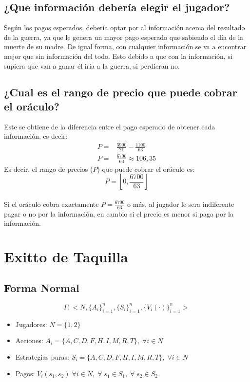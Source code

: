 \documentclass[12pt]{article}
\begin{document}
\subsection{¿Que información debería elegir el jugador?}
Según los pagos esperados, debería optar por al información acerca del resultado de la guerra, ya que le genera un mayor pago esperado que sabiendo el día de la muerte de su madre. De igual forma, con cualquier información se va a encontrar mejor que sin información del todo. Esto debido a que con la información, si supiera que van a ganar él iría a la guerra, si perdieran no. 
\subsection{¿Cual es el rango de precio que puede cobrar el oráculo?}
Este se obtiene de la diferencia entre el pago esperado de obtener cada información, es decir: 
\begin{align*}
    P=&\frac{5900}{21}-\frac{1100}{63}\\
    P=&\frac{6700}{63}\approx 106,35
\end{align*}
Es decir, el rango de precios ($P$) que puede cobrar el oráculo es: $$P=[0,\frac{6700}{63}]$$\\
Si el oráculo cobra exactamente $P=\frac{6700}{63}$ o más, al jugador le sera indiferente pagar o no por la información, en cambio si el precio es menor si paga por la información. 
\newpage
\section{Exitto de Taquilla}
\subsection{}
\subsection{Forma Normal}
$$\Gamma:<N,\{A_i\}^n_{i=1},\{S_i\}^n_{i=1},\{V_i(\cdot)\}^n_{i=1}>$$
\begin{itemize}
    \item Jugadores: $N=\{1,2\}$
    \item Acciones: $A_i=\{A,C,D,F,H,I,M,R,T\},\; \forall   i\in N$
    \item Estrategias puras: $S_i=\{A,C,D,F,H,I,M,R,T\},\; \forall   i\in N$
    \item Pagos: $V_i(s_1,s_2)\; \forall i \in N, \; \forall\; s_1 \in S_1, \; \forall\; s_2 \in S_2$
\end{itemize}
\end{document}
